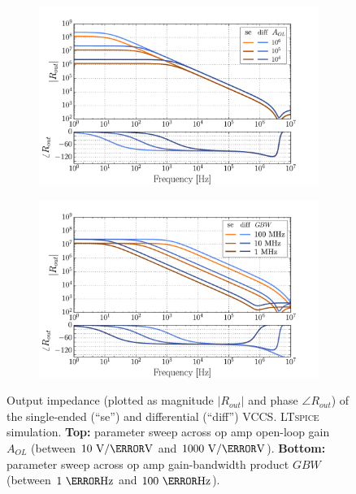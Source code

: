 \documentclass[10pt]{article}
\let\OldAngle\angle
\renewcommand{\angle}{\anglesym}
\begin{document}
\begin{figure}[t!]
	\begin{subfigure}{\textwidth}
        \centering
 		\includegraphics[scale=.6]{R_out_across_A_OL.pdf}
        \caption{\small }
        \label{fig:spice_ac_output_resistance_vs_AOL}
    \end{subfigure}

	\begin{subfigure}{\textwidth}
        \centering
 		\includegraphics[scale=.6]{R_out_across_GBW.pdf}
        \caption{\small}
        \label{fig:spice_ac_output_resistance_vs_GBW}
    \end{subfigure}

    \caption{\small Output impedance (plotted as magnitude $|R_{out}|$ and phase $\OldAngle R_{out}$) of the single-ended (``se'') and differential (``diff'') VCCS. \textsc{LTspice} simulation. \textbf{Top:} parameter sweep across op amp open-loop gain $A_{OL}$ (between $10~\volt/\milli\volt$ and $1000~\volt/\milli\volt$). \textbf{Bottom:} parameter sweep across op amp gain-bandwidth product $GBW$ (between $1~\mega\hertz$ and $100~\mega\hertz$).}
    \label{fig:spice_ac_output_resistance}

\end{figure}
\end{document}
